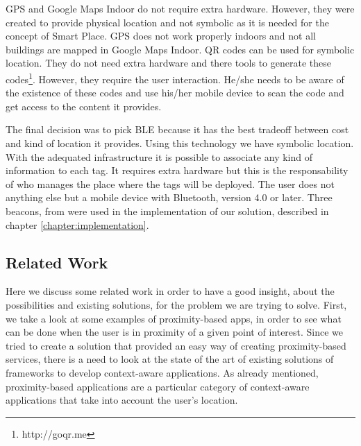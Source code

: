 

\gls{GPS} and Google Maps Indoor do not require extra hardware. However, they were created to provide physical location and not symbolic as it is needed for the concept of Smart Place.
\gls{GPS} does not work properly indoors and not all buildings are mapped in Google Maps Indoor.
\gls{QR} codes can be used for symbolic location. They do not need extra hardware and there tools to generate these codes\footnote{http://goqr.me}.
However, they require the user interaction. He/she needs to be aware of the existence of these codes and use his/her mobile device to scan the code and get access to the content it provides.

The final decision was to pick \gls{BLE} because it has the best tradeoff between cost and kind of location it provides. Using this technology we have symbolic location. With the adequated infrastructure it is possible to associate any kind of information to each tag.
It requires extra hardware but this is the responsability of who manages the place where the tags will be deployed.
The user does not anything else but a mobile device with Bluetooth, version 4.0 or later.
Three beacons, from  were used in the implementation of our solution, described in chapter \ref{chapter:implementation}.

\subsection{Related Work}
\label{sec:background_related_work}
Here we discuss some related work in order to have a good insight, about the possibilities and existing solutions, for the problem we are trying to solve.
First, we take a look at some examples of proximity-based apps, in order to see what can be done when the user is in proximity of a given point of interest.
Since we tried to create a solution that provided an easy way of creating proximity-based services, there is a need to look at the state of the art of existing solutions of frameworks to develop context-aware applications. As already mentioned, proximity-based applications are a particular category of context-aware applications that take into account the user's location.

